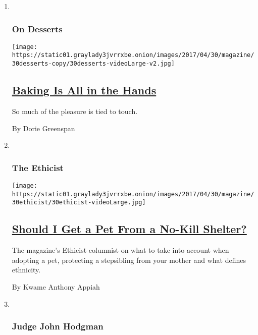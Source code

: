 \begin{enumerate}
\def\labelenumi{\arabic{enumi}.}
\item ~
  \hypertarget{on-desserts}{%
  \subsubsection{On Desserts}\label{on-desserts}}

  \texttt{[image: https://static01.graylady3jvrrxbe.onion/images/2017/04/30/magazine/30desserts-copy/30desserts-videoLarge-v2.jpg]}

  \hypertarget{baking-is-all-in-the-hands}{%
  \subsection{\texorpdfstring{\href{/2017/04/26/magazine/baking-is-all-in-the-hands.html}{Baking
  Is All in the
  Hands}}{Baking Is All in the Hands}}\label{baking-is-all-in-the-hands}}

  So much of the pleasure is tied to touch.

  By Dorie Greenspan
\item ~
  \hypertarget{the-ethicist}{%
  \subsubsection{The Ethicist}\label{the-ethicist}}

  \texttt{[image: https://static01.graylady3jvrrxbe.onion/images/2017/04/30/magazine/30ethicist/30ethicist-videoLarge.jpg]}

  \hypertarget{should-i-get-a-pet-from-a-no-kill-shelter}{%
  \subsection{\texorpdfstring{\href{/2017/04/26/magazine/should-i-get-a-pet-from-a-no-kill-shelter.html}{Should
  I Get a Pet From a No-Kill
  Shelter?}}{Should I Get a Pet From a No-Kill Shelter?}}\label{should-i-get-a-pet-from-a-no-kill-shelter}}

  The magazine's Ethicist columnist on what to take into account when
  adopting a pet, protecting a stepsibling from your mother and what
  defines ethnicity.

  By Kwame Anthony Appiah
\item ~
  \hypertarget{judge-john-hodgman}{%
  \subsubsection{Judge John Hodgman}\label{judge-john-hodgman}}


\end{enumerate}
